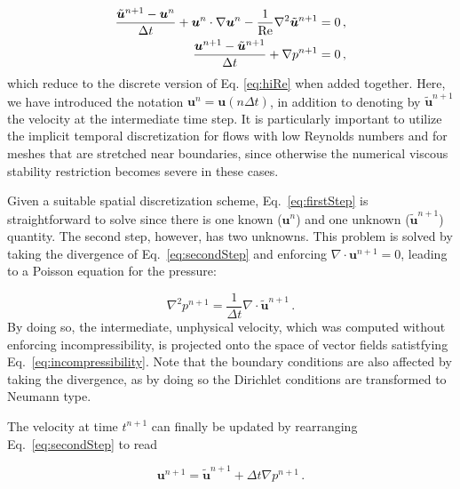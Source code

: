 \documentclass[final,3p,twocolumn]{elsarticle}
\begin{document}
\begin{align}
    \label{eq:firstStep}
    \frac{\tilde{\bm{u}}^{n+1} - \bm{u}^n}{\Delta t} + \bm{u}^n \cdot \nabla
    \bm{u}^n - \frac{1}{\rm Re} \nabla^2 \tilde{\bm{u}}^{n+1} &= 0 \,, \\
    \label{eq:secondStep}
    \frac{\bm{u}^{n+1} - \tilde{\bm{u}}^{n+1}}{\Delta t} + \nabla p^{n+1} &= 0
    \,,
\end{align}
%
which reduce to the discrete version of Eq. \eqref{eq:hiRe} when added
together. Here, we have introduced the notation $\bm{u}^n = \bm{u}(n \Delta
t)$, in addition to denoting by $\tilde{\bm{u}}^{n+1}$ the velocity at the
intermediate time step.  It is particularly important to utilize the implicit
temporal discretization for flows with low Reynolds numbers and for meshes that
are stretched near boundaries, since otherwise the numerical viscous stability
restriction becomes severe in these cases. 

Given a suitable spatial discretization scheme, Eq.\ \eqref{eq:firstStep} is
straightforward to solve since there is one known ($\bm{u}^n$) and one unknown
($\tilde{\bm{u}}^{n+1}$) quantity. The second step, however, has two unknowns.
This problem is solved by taking the divergence of Eq. \eqref{eq:secondStep}
and enforcing $\nabla \cdot \bm{u}^{n+1} = 0$, leading to a Poisson equation
for the pressure:

\begin{equation} 
    \nabla^2 p^{n+1} = \frac{1}{\Delta t} \nabla \cdot \tilde{\bm{u}}^{n+1} \,.
    \label{eq:poissonPressure}
\end{equation}
%
By doing so, the intermediate, unphysical velocity, which was computed without
enforcing incompressibility, is projected onto the space of vector fields
satistfying Eq.\ \eqref{eq:incompressibility}. Note that the boundary
conditions are also affected by taking the divergence, as by doing so the
Dirichlet conditions are transformed to Neumann type. 

The velocity at time $t^{n+1}$ can finally be updated by rearranging Eq.\
\eqref{eq:secondStep} to read 

\begin{equation}
    \bm{u}^{n+1} = \tilde{\bm{u}}^{n+1} + \Delta t \nabla p^{n+1} \,. 
    \label{eq:velocityUpdate}
\end{equation}
\end{document}
